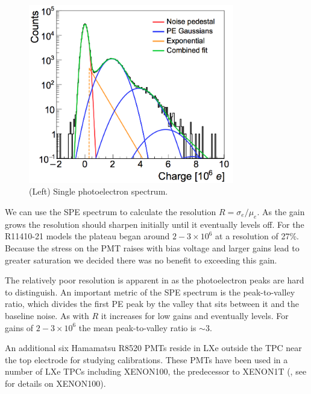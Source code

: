\begin{figure}
\centering
\includegraphics[width=0.8\textwidth]{SPESpectrum}
\caption{(Left) Single photoelectron spectrum.}
\label{fig:xenon1t_pmt_spe}
\end{figure}

We can use the SPE spectrum to calculate the resolution $R = \sigma_{e} / \mu_{e}$.  As the gain grows the resolution should sharpen
initially until it eventually levels off.  For the R11410-21 models the plateau began around $2-3 \times 10^{6}$ at a resolution of
27\%.  Because the stress on the PMT raises with bias voltage and larger gains lead to greater saturation we decided there was no benefit
to exceeding this gain.

The relatively poor resolution is apparent in  as the photoelectron peaks are hard to distinguish.  An
important metric of the SPE spectrum is the peak-to-valley ratio, which divides the first PE peak by the valley that sits between it and
the baseline noise.  As with $R$ it increases for low gains and eventually levels.  For gains of $2-3 \times 10^{6}$ the mean
peak-to-valley ratio is ${\sim} 3$.

An additional six Hamamatsu R8520 PMTs reside in LXe outside the TPC near the top electrode for studying calibrations.  These PMTs have
been used in a number of LXe TPCs including XENON100, the predecessor to XENON1T (, see  for
details on XENON100).




